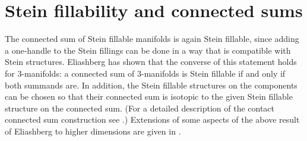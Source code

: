 \documentclass[12pt]{amsart}
\newcommand\acs{\varphi}  				%
\theoremstyle{remark}
\newtheorem{Remark}[Theorem]{Remark}
\newcommand{\jbcomm}[1]{\begingroup\color{green}JB:~#1\endgroup}
\begin{document}
\begin{comment}
\begin{Remark}
Notice that the contact structure on the final element 
$(M_{max}, \acs_{max})$ is not specified by Proposition~\ref{prop:final_elements}. 
In
fact, by recent results announced in \cite{BEE} the symplectic
homology of a Louville domain filling any manifold is preserved under
attachment of flexible Stein handles in the sense of Murphy
(cf.\ \cite{Cieliebak&Eliashberg12}). So there are Liouville fillings
on $(M_{max}, \acs_{max})$ so that the symplectic homology is that of
any other given contact manifold. In particular, we have the slightly
surprising conclusion that there are contact structures on $S^5$ so
that symplectic homology is that of any other Louville domain with
vanishing first Chern class.
\end{Remark}
\end{comment}








\section{Stein fillability and connected sums} 
\label{subsec:stein_fillability_and_connected_sums}

The connected sum of Stein fillable manifolds is again
Stein fillable, since adding a one-handle to the Stein fillings can
be done in a way that is compatible with Stein structures. Eliashberg \cite[Section 8]{Eliashberg90} has shown that the 
converse of this statement holds for 3-manifolds: a connected sum
of $3$-manifolds is Stein fillable if and only if both summands
are. In addition, the Stein fillable structures on the components
can be chosen so that their connected sum is isotopic to the given Stein fillable
structure on the connected sum.
(For a detailed description of the contact connected sum construction
see \cite[p. 301-302]{Geiges08}.) 
Extensions of some aspects of the above result of Eliashberg
to higher dimensions are
given in \cite{GNW}.
\end{document}
